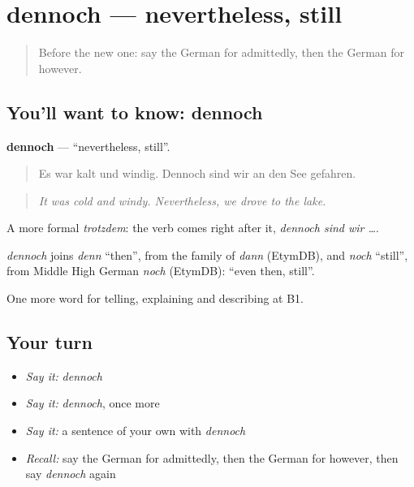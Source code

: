 \section[dennoch]{dennoch — nevertheless, still}

\label{lesson:GE-C341-dennoch}



\begin{quote}
Before the new one: say the German for admittedly, then the German for however.
\end{quote}

\subsection*{You'll want to know: dennoch}
\textbf{dennoch} — \textquotedblleft{}nevertheless, still\textquotedblright{}.

\begin{quote}
Es war kalt und windig. Dennoch sind wir an den See gefahren.
\end{quote}

\begin{quote}
\emph{It was cold and windy. Nevertheless, we drove to the lake.}
\end{quote}

A more formal \emph{trotzdem}: the verb comes right after it, \emph{dennoch sind wir …}.

\begin{cousinweb}
\emph{dennoch} joins \emph{denn} \textquotedblleft{}then\textquotedblright{}, from the family of \emph{dann} (EtymDB), and \emph{noch} \textquotedblleft{}still\textquotedblright{}, from Middle High German \emph{noch} (EtymDB): \textquotedblleft{}even then, still\textquotedblright{}.
\end{cousinweb}

\begin{grammarlens}[title={What you've built}]
One more word for telling, explaining and describing at B1.
\end{grammarlens}

\subsection*{Your turn}
\begin{itemize}
\raggedright
  \item \emph{Say it:} \emph{dennoch}
  \item \emph{Say it:} \emph{dennoch}, once more
  \item \emph{Say it:} a sentence of your own with \emph{dennoch}
  \item \emph{Recall:} say the German for admittedly, then the German for however, then say \emph{dennoch} again
\end{itemize}

